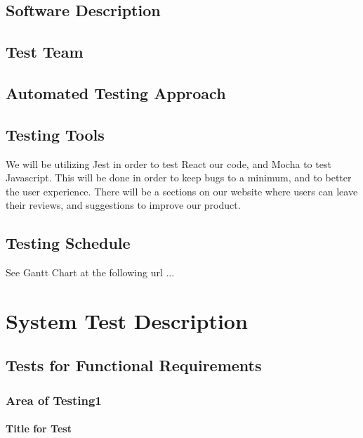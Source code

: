 \documentclass[12pt, titlepage]{article}
\begin{document}
\subsection{Software Description}

\subsection{Test Team}

\subsection{Automated Testing Approach}

\subsection{Testing Tools}
We will be utilizing Jest in order to test React our code, and Mocha to test Javascript. This will be done in order to keep bugs to a minimum, and to better the user experience. There will be a sections on our website where users can leave their reviews, and suggestions to improve our product. 

\subsection{Testing Schedule}
		
See Gantt Chart at the following url ...

\section{System Test Description}
	
\subsection{Tests for Functional Requirements}

\subsubsection{Area of Testing1}
		
\paragraph{Title for Test}
\end{document}
